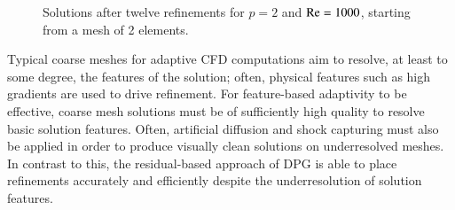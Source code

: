\begin{figure}
\centering
{}
\caption{Solutions after twelve refinements for $p=2$ and $\Reyn = 1000$, starting from a mesh of 2 elements.}
\label{fig:Re1000}
\end{figure}

Typical coarse meshes for adaptive CFD computations aim to resolve, at least to some degree, the features of the solution; often, physical features such as high gradients are used to drive refinement.  For feature-based adaptivity to be effective, coarse mesh solutions must be of sufficiently high quality to resolve basic solution features.  Often, artificial diffusion and shock capturing must also be applied in order to produce visually clean solutions on underresolved meshes.  In contrast to this, the residual-based approach of DPG is able to place refinements accurately and efficiently despite the underresolution of solution features.  


